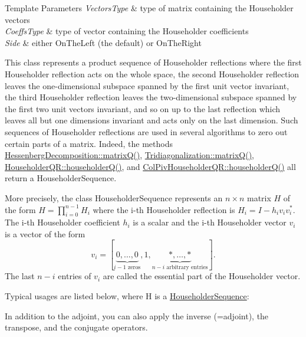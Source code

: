 \begin{DoxyTemplParams}{Template Parameters}
{\em Vectors\+Type} & type of matrix containing the Householder vectors \\
\hline
{\em Coeffs\+Type} & type of vector containing the Householder coefficients \\
\hline
{\em Side} & either On\+The\+Left (the default) or On\+The\+Right\\
\hline
\end{DoxyTemplParams}
This class represents a product sequence of Householder reflections where the first Householder reflection acts on the whole space, the second Householder reflection leaves the one-\/dimensional subspace spanned by the first unit vector invariant, the third Householder reflection leaves the two-\/dimensional subspace spanned by the first two unit vectors invariant, and so on up to the last reflection which leaves all but one dimensions invariant and acts only on the last dimension. Such sequences of Householder reflections are used in several algorithms to zero out certain parts of a matrix. Indeed, the methods \mbox{\hyperlink{class_eigen_1_1_hessenberg_decomposition_a346441e4902a58d43d698ac3da6ff791}{Hessenberg\+Decomposition\+::matrix\+Q()}}, \mbox{\hyperlink{class_eigen_1_1_tridiagonalization_a000f7392eda930576ffd2af1fae54af2}{Tridiagonalization\+::matrix\+Q()}}, \mbox{\hyperlink{class_eigen_1_1_householder_q_r_affd506c10ef2d25f56e7b1f9f25ff885}{Householder\+Q\+R\+::householder\+Q()}}, and \mbox{\hyperlink{class_eigen_1_1_col_piv_householder_q_r_a28ab9d8916ca609c5469c4c192fbfa28}{Col\+Piv\+Householder\+Q\+R\+::householder\+Q()}} all return a Householder\+Sequence.

More precisely, the class Householder\+Sequence represents an $ n \times n $ matrix $ H $ of the form $ H = \prod_{i=0}^{n-1} H_i $ where the i-\/th Householder reflection is $ H_i = I - h_i v_i v_i^* $. The i-\/th Householder coefficient $ h_i $ is a scalar and the i-\/th Householder vector $ v_i $ is a vector of the form \[ v_i = [\underbrace{0, \ldots, 0}_{i-1\mbox{ zeros}}, 1, \underbrace{*, \ldots,*}_{n-i\mbox{ arbitrary entries}} ]. \] The last $ n-i $ entries of $ v_i $ are called the essential part of the Householder vector.

Typical usages are listed below, where H is a \mbox{\hyperlink{class_eigen_1_1_householder_sequence}{Householder\+Sequence}}\+: 
\begin{DoxyCode}{0}
\end{DoxyCode}
 In addition to the adjoint, you can also apply the inverse (=adjoint), the transpose, and the conjugate operators.


